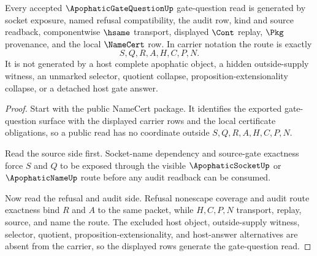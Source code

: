 \begin{theorem}
\label{thm:apophatic-gate-question-derivation-route}
Every accepted $\ApophaticGateQuestionUp$ gate-question read is generated by socket exposure, named refusal compatibility, the audit row, kind and source readback, componentwise $\hsame$ transport, displayed $\Cont$ replay, $\Pkg$ provenance, and the local $\NameCert$ row. In carrier notation the route is exactly
$$
S,Q,R,A,H,C,P,N.
$$
It is not generated by a host complete apophatic object, a hidden outside-supply witness, an unmarked selector, quotient collapse, proposition-extensionality collapse, or a detached host gate answer.
\end{theorem}
\begin{proof}
Start with the public NameCert package. It identifies the exported gate-question surface with the displayed carrier rows and the local certificate obligations, so a public read has no coordinate outside $S,Q,R,A,H,C,P,N$.

Read the source side first. Socket-name dependency and source-gate exactness force $S$ and $Q$ to be exposed through the visible $\ApophaticSocketUp$ or $\ApophaticNameUp$ route before any audit readback can be consumed.

Now read the refusal and audit side. Refusal nonescape coverage and audit route exactness bind $R$ and $A$ to the same packet, while $H,C,P,N$ transport, replay, source, and name the route. The excluded host object, outside-supply witness, selector, quotient, proposition-extensionality, and host-answer alternatives are absent from the carrier, so the displayed rows generate the gate-question read.
\end{proof}
